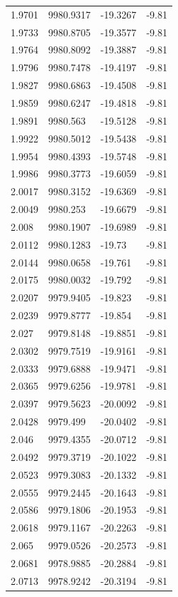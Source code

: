 \begin{table}[H]
\begin{tabular}{llll}
1.9701 & 9980.9317 & -19.3267 & -9.81 \\
1.9733 & 9980.8705 & -19.3577 & -9.81 \\
1.9764 & 9980.8092 & -19.3887 & -9.81 \\
1.9796 & 9980.7478 & -19.4197 & -9.81 \\
1.9827 & 9980.6863 & -19.4508 & -9.81 \\
1.9859 & 9980.6247 & -19.4818 & -9.81 \\
1.9891 & 9980.563 & -19.5128 & -9.81 \\
1.9922 & 9980.5012 & -19.5438 & -9.81 \\
1.9954 & 9980.4393 & -19.5748 & -9.81 \\
1.9986 & 9980.3773 & -19.6059 & -9.81 \\
2.0017 & 9980.3152 & -19.6369 & -9.81 \\
2.0049 & 9980.253 & -19.6679 & -9.81 \\
2.008 & 9980.1907 & -19.6989 & -9.81 \\
2.0112 & 9980.1283 & -19.73 & -9.81 \\
2.0144 & 9980.0658 & -19.761 & -9.81 \\
2.0175 & 9980.0032 & -19.792 & -9.81 \\
2.0207 & 9979.9405 & -19.823 & -9.81 \\
2.0239 & 9979.8777 & -19.854 & -9.81 \\
2.027 & 9979.8148 & -19.8851 & -9.81 \\
2.0302 & 9979.7519 & -19.9161 & -9.81 \\
2.0333 & 9979.6888 & -19.9471 & -9.81 \\
2.0365 & 9979.6256 & -19.9781 & -9.81 \\
2.0397 & 9979.5623 & -20.0092 & -9.81 \\
2.0428 & 9979.499 & -20.0402 & -9.81 \\
2.046 & 9979.4355 & -20.0712 & -9.81 \\
2.0492 & 9979.3719 & -20.1022 & -9.81 \\
2.0523 & 9979.3083 & -20.1332 & -9.81 \\
2.0555 & 9979.2445 & -20.1643 & -9.81 \\
2.0586 & 9979.1806 & -20.1953 & -9.81 \\
2.0618 & 9979.1167 & -20.2263 & -9.81 \\
2.065 & 9979.0526 & -20.2573 & -9.81 \\
2.0681 & 9978.9885 & -20.2884 & -9.81 \\
2.0713 & 9978.9242 & -20.3194 & -9.81 \\

\end{tabular}
\end{table}

